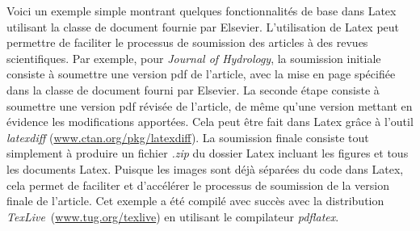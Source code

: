 \documentclass[../exemple_master.tex]{subfiles}
\begin{document}
Voici un exemple simple montrant quelques fonctionnalités de base dans Latex utilisant la classe de document fournie par Elsevier. L'utilisation de Latex peut permettre de faciliter le processus de soumission des articles à des revues scientifiques. Par exemple, pour \emph{Journal of Hydrology}, la soumission initiale consiste à soumettre une version pdf de l'article, avec la mise en page spécifiée dans la classe de document fourni par Elsevier. La seconde étape consiste à soumettre une version pdf révisée de l'article, de même qu'une version mettant en évidence les modifications apportées. Cela peut être fait dans Latex grâce à l'outil \emph{latexdiff} (\url{www.ctan.org/pkg/latexdiff}). La soumission finale consiste tout simplement à produire un fichier \emph{.zip} du dossier Latex incluant les figures et tous les documents Latex. Puisque les images sont déjà séparées du code dans Latex, cela permet de faciliter et d'accélérer le processus de soumission de la version finale de l'article. Cet exemple a été compilé avec succès avec la distribution \emph{TexLive}~(\url{www.tug.org/texlive}) en utilisant le compilateur \emph{pdflatex}.
\end{document}
